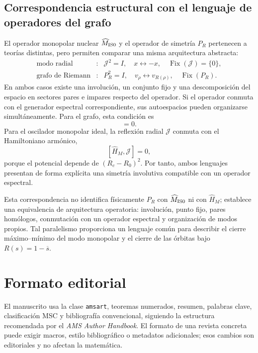 \documentclass[11pt]{amsart}
\theoremstyle{definition}
\theoremstyle{remark}
\begin{document}
\subsection{Correspondencia estructural con el lenguaje de operadores del grafo}
El operador monopolar nuclear $\widehat M_{\rm IS0}$ y el operador de simetría $P_R$ pertenecen a teorías distintas, pero permiten comparar una misma arquitectura abstracta:
\begin{equation}\label{eq:operatorparallel}
\begin{array}{ccc}
\text{modo radial} &:& \mathcal J^2=I,\quad x\leftrightarrow -x,\quad \operatorname{Fix}(\mathcal J)=\{0\},\\[1mm]
\text{grafo de Riemann} &:& P_R^2=I,\quad v_\rho\leftrightarrow v_{R(\rho)},\quad \operatorname{Fix}(P_R).
\end{array}
\end{equation}
En ambos casos existe una involución, un conjunto fijo y una descomposición del espacio en sectores pares e impares respecto del operador. Si el operador conmuta con el generador espectral correspondiente, sus autoespacios pueden organizarse simultáneamente. Para el grafo, esta condición es
\begin{equation}
 [L,P_R]=0.
\end{equation}
Para el oscilador monopolar ideal, la reflexión radial $\mathcal J$ conmuta con el Hamiltoniano armónico,
\begin{equation}\label{eq:monoparity}
 [\widehat H_M,\mathcal J]=0,
\end{equation}
porque el potencial depende de $(R_c-R_0)^2$. Por tanto, ambos lenguajes presentan de forma explícita una simetría involutiva compatible con un operador espectral.

Esta correspondencia no identifica físicamente $P_R$ con $\widehat M_{\rm IS0}$ ni con $\widehat H_M$; establece una equivalencia de arquitectura operatoria: involución, punto fijo, pares homólogos, conmutación con un operador espectral y organización de modos propios. Tal paralelismo proporciona un lenguaje común para describir el cierre máximo--mínimo del modo monopolar y el cierre de las órbitas bajo $R(s)=1-\overline{s}$.

\section{Formato editorial}
El manuscrito usa la clase \texttt{amsart}, teoremas numerados, resumen, palabras clave, clasificación MSC y bibliografía convencional, siguiendo la estructura recomendada por el \emph{AMS Author Handbook}. El formato de una revista concreta puede exigir macros, estilo bibliográfico o metadatos adicionales; esos cambios son editoriales y no afectan la matemática.
\end{document}
